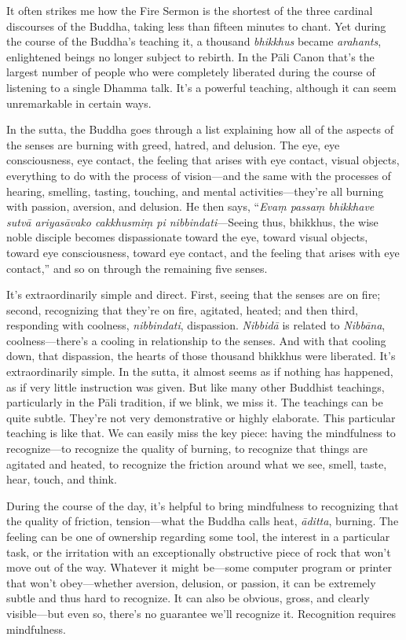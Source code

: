 
It often strikes me how the Fire Sermon is the shortest of the three 
cardinal discourses of the Buddha, taking less than fifteen minutes to 
chant. Yet during the course of the Buddha's teaching it, a thousand 
\emph{bhikkhus} became \emph{arahants}, enlightened beings no longer 
subject to rebirth. In the Pāli Canon that's the largest number of 
people who were completely liberated during the course of listening to 
a single Dhamma talk. It's a powerful teaching, although it can seem 
unremarkable in certain ways.

In the sutta, the Buddha goes through a list explaining how all of the 
aspects of the senses are burning with greed, hatred, and delusion. The 
eye, eye consciousness, eye contact, the feeling that arises with eye 
contact, visual objects, everything to do with the process of 
vision---and the same with the processes of hearing, smelling, tasting, 
touching, and mental activities---they're all burning with passion, 
aversion, and delusion. He then says, ``\emph{Evaṃ passaṃ bhikkhave 
sutvā ariyasāvako cakkhusmiṃ pi nibbindati}---Seeing thus, 
bhikkhus, the wise noble disciple becomes dispassionate toward the eye, 
toward visual objects, toward eye consciousness, toward eye contact, 
and the feeling that arises with eye contact,'' and so on through the 
remaining five senses.

It's extraordinarily simple and direct. First, seeing that the senses 
are on fire; second, recognizing that they're on fire, agitated, 
heated; and then third, responding with coolness, \emph{nibbindati}, 
dispassion. \emph{Nibbidā} is related to \emph{Nibbāna}, 
coolness---there's a cooling in relationship to the senses. And with 
that cooling down, that dispassion, the hearts of those thousand 
bhikkhus were liberated. It's extraordinarily simple. In the sutta, it 
almost seems as if nothing has happened, as if very little instruction 
was given. But like many other Buddhist teachings, particularly in the 
Pāli tradition, if we blink, we miss it. The teachings can be quite 
subtle. They're not very demonstrative or highly elaborate. This 
particular teaching is like that. We can easily miss the key piece: 
having the mindfulness to recognize---to recognize the quality of 
burning, to recognize that things are agitated and heated, to recognize 
the friction around what we see, smell, taste, hear, touch, and think.

During the course of the day, it's helpful to bring mindfulness to 
recognizing that the quality of friction, tension---what the Buddha 
calls heat, \emph{āditta}, burning. The feeling can be one of 
ownership regarding some tool, the interest in a particular task, or 
the irritation with an exceptionally obstructive piece of rock that 
won't move out of the way. Whatever it might be---some computer program 
or printer that won't obey---whether aversion, delusion, or passion, it 
can be extremely subtle and thus hard to recognize. It can also be 
obvious, gross, and clearly visible---but even so, there's no guarantee 
we'll recognize it. Recognition requires mindfulness.

